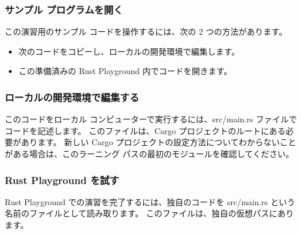 \subsubsection{サンプル プログラムを開く}

この演習用のサンプル コードを操作するには、次の 2 つの方法があります。

\begin{itemize}
\item 次のコードをコピーし、ローカルの開発環境で編集します。
\item この準備済みの Rust Playground 内でコードを開きます。
\end{itemize}

\subsubsection{ローカルの開発環境で編集する}

このコードをローカル コンピューターで実行するには、src/main.rs ファイルでコードを記述します。 このファイルは、Cargo プロジェクトのルートにある必要があります。 新しい Cargo プロジェクトの設定方法についてわからないことがある場合は、このラーニング パスの最初のモジュールを確認してください。

\subsubsection{Rust Playground を試す}

Rust Playground での演習を完了するには、独自のコードを src/main.rs という名前のファイルとして読み取ります。 このファイルは、独自の仮想パスにあります。


